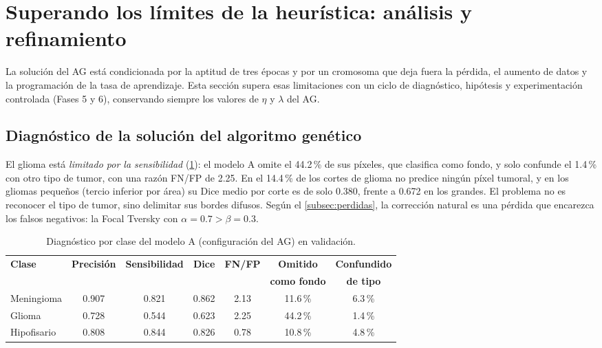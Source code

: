 \section{Superando los límites de la heurística: análisis y refinamiento}\label{sec:refinamiento}

La solución del AG está condicionada por la aptitud de tres épocas y por un cromosoma que deja fuera la pérdida, el aumento de datos y la programación de la tasa de aprendizaje. Esta sección supera esas limitaciones con un ciclo de diagnóstico, hipótesis y experimentación controlada (Fases 5 y 6), conservando siempre los valores de $\eta$ y $\lambda$ del AG.

\subsection{Diagnóstico de la solución del algoritmo genético}\label{subsec:diagnostico}

El glioma está \emph{limitado por la sensibilidad} (\cref{tab:diagnostico-A}): el modelo A omite el 44.2\,\% de sus píxeles, que clasifica como fondo, y solo confunde el 1.4\,\% con otro tipo de tumor, con una razón FN/FP de 2.25. En el 14.4\,\% de los cortes de glioma no predice ningún píxel tumoral, y en los gliomas pequeños (tercio inferior por área) su Dice medio por corte es de solo 0.380, frente a 0.672 en los grandes. El problema no es reconocer el tipo de tumor, sino delimitar sus bordes difusos. Según el \cref{subsec:perdidas}, la corrección natural es una pérdida que encarezca los falsos negativos: la Focal Tversky con $\alpha=0.7>\beta=0.3$.

\begin{table}[htbp]
  \centering
  \caption{Diagnóstico por clase del modelo A (configuración del AG) en validación.}
  \label{tab:diagnostico-A}
  \small
  \begin{tabular}{lcccccc}
    \toprule
    \textbf{Clase} & \textbf{Precisión} & \textbf{Sensibilidad} & \textbf{Dice} & \textbf{FN/FP} & \textbf{Omitido} & \textbf{Confundido} \\
    & & & & & \textbf{como fondo} & \textbf{de tipo} \\
    \midrule
    Meningioma  & 0.907 & 0.821 & 0.862 & 2.13 & 11.6\,\% & 6.3\,\% \\
    Glioma      & 0.728 & 0.544 & 0.623 & 2.25 & 44.2\,\% & 1.4\,\% \\
    Hipofisario & 0.808 & 0.844 & 0.826 & 0.78 & 10.8\,\% & 4.8\,\% \\
    \bottomrule
  \end{tabular}
\end{table}


